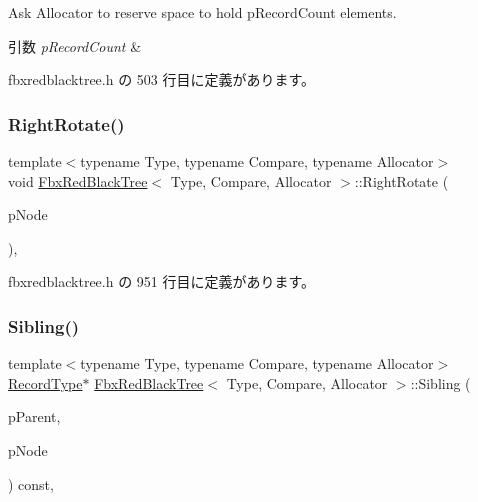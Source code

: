 Ask Allocator to reserve space to hold p\+Record\+Count elements. 
\begin{DoxyParams}{引数}
{\em p\+Record\+Count} & \\
\hline
\end{DoxyParams}


 fbxredblacktree.\+h の 503 行目に定義があります。

\mbox{\label{class_fbx_red_black_tree_a390eaccc303de294803e1fd2272cbc73}} 
\subsubsection{\texorpdfstring{Right\+Rotate()}{RightRotate()}}
{\footnotesize\ttfamily template$<$typename Type, typename Compare, typename Allocator$>$ \\
void \hyperlink{class_fbx_red_black_tree}{Fbx\+Red\+Black\+Tree}$<$ Type, Compare, Allocator $>$\+::Right\+Rotate (\begin{DoxyParamCaption}\item[{\hyperlink{class_fbx_red_black_tree_1_1_record_type}{Record\+Type} $\ast$}]{p\+Node }\end{DoxyParamCaption})\hspace{0.3cm}{\ttfamily [inline]}, {\ttfamily [protected]}}



 fbxredblacktree.\+h の 951 行目に定義があります。

\mbox{\label{class_fbx_red_black_tree_a634b41949b2cdef5488abcb444f896c6}} 
\subsubsection{\texorpdfstring{Sibling()}{Sibling()}}
{\footnotesize\ttfamily template$<$typename Type, typename Compare, typename Allocator$>$ \\
\hyperlink{class_fbx_red_black_tree_1_1_record_type}{Record\+Type}$\ast$ \hyperlink{class_fbx_red_black_tree}{Fbx\+Red\+Black\+Tree}$<$ Type, Compare, Allocator $>$\+::Sibling (\begin{DoxyParamCaption}\item[{const \hyperlink{class_fbx_red_black_tree_1_1_record_type}{Record\+Type} $\ast$}]{p\+Parent,  }\item[{const \hyperlink{class_fbx_red_black_tree_1_1_record_type}{Record\+Type} $\ast$}]{p\+Node }\end{DoxyParamCaption}) const\hspace{0.3cm}{\ttfamily [inline]}, {\ttfamily [protected]}}



